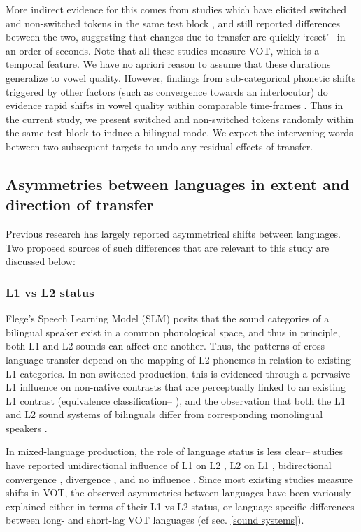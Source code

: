 \documentclass[charis,linguex]{glossa}
\begin{document}
More indirect evidence for this comes from studies which have elicited switched and non-switched tokens in the same test block \citep{tsui2019impact,olson2013bilingual}, and still reported differences between the two, suggesting that changes due to transfer are quickly `reset'-- in an order of seconds. Note that all these studies measure VOT, which is a temporal feature. We have no apriori reason to assume that these durations generalize to vowel quality. However, findings from sub-categorical phonetic shifts triggered by other factors (such as convergence towards an interlocutor) do evidence rapid shifts in vowel quality within comparable time-frames \citep{pardo2010expressing,babel2010dialect,babel2012evidence}. Thus in the current study, we present switched and non-switched tokens randomly within the same test block to induce a bilingual mode. We expect the intervening words between two subsequent targets to undo any residual effects of transfer.


\subsection{Asymmetries between languages in extent and direction of transfer} \label{asymmetries}
Previous research has largely reported asymmetrical shifts between languages. Two proposed sources of such differences that are relevant to this study are discussed below: 

\subsubsection{L1 vs L2 status} 
Flege's Speech Learning Model (SLM) \citeyear{flege1995second,flege2007language} posits that the sound categories of a bilingual speaker exist in a common phonological space, and thus in principle, both L1 and L2 sounds can affect one another. Thus, the patterns of cross-language transfer depend on the mapping of L2 phonemes in relation to existing L1 categories. In non-switched production, this is evidenced through a pervasive L1 influence on non-native contrasts that are perceptually linked to an existing L1 contrast (equivalence classification-- \cite{flege1984limits,flege1987production}), and
the observation that both the L1 and L2 sound systems of bilinguals differ from corresponding monolingual speakers \citep{guion2003vowel}. 

In mixed-language production, the role of language status is less clear-- studies have reported unidirectional influence of L1 on L2 \citep{balukas2015spanish,antoniou2011inter,vsimavckova2015immediate,goldrick2014language}, L2 on L1 \citep{tsui2019impact,elias2017effects, olson2013bilingual}, bidirectional convergence \citep{bullock2009trying, olson2016role}, divergence \citep{bullock2009trying,vsimavckova2018patterns}, and no influence \citep{muldner2019phonetics,schwartz2015language}. Since most existing studies measure shifts in VOT, the observed asymmetries between languages have been variously explained either in terms of their L1 vs L2 status, or language-specific differences between long- and short-lag VOT languages (cf sec. \ref{sound systems}).
\end{document}
